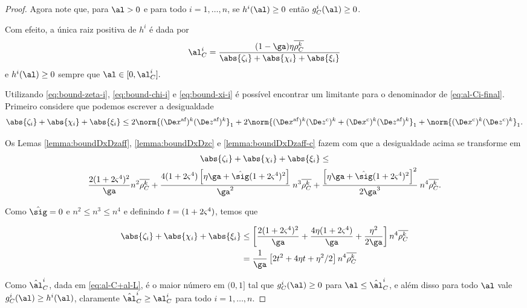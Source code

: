 \begin{proof}
Agora note que, para $\al>0$ e para todo $i=1,\ldots,n$, se $h^i(\al)\geq0$ então $g_C^i(\al)\geq 0$. 

Com efeito, a única raiz positiva de $h^i$ é dada por
\begin{equation}
	\label{eq:al-Ci-final}
	\al_{C}^i = \dfrac{(1-\ga)\eta\rhoCkb }{\abs{\zeta_i} + \abs{\chi_i} + \abs{\xi_i}}
\end{equation}
e $h^i(\al)\geq 0$ sempre que $\al\in[0,\al_{C}^i].$ 



Utilizando \eqref{eq:bound-zeta-i}, \eqref{eq:bound-chi-i} e \eqref{eq:bound-xi-i}  é possível encontrar um limitante para o denominador de \eqref{eq:al-Ci-final}. Primeiro considere que podemos escrever a  
desigualdade
\[
\abs{\zeta_i} + \abs{\chi_i} + \abs{\xi_i} \leq 2\norm{ \dekx  \dekz }_1 + 2 \norm{ \dekx \Dekcoz + \Dekcox \dekz }_1 + \norm{\Dekcox\Dekcoz}_1.
\]



Os Lemas \ref{lemma:boundDxDzaff},   \ref{lemma:boundDxDzc} e \ref{lemma:boundDxDzaff-c}  fazem com que a desigualdade acima se transforme em 
\begin{multline*}
\abs{\zeta_i} + \abs{\chi_i}  + \abs{\xi_i}  \leq \\  \frac{2(1 + 2\bdxzstar^{4})^{2} }{\ga} n^{2}\rhoCkb + 
												\dfrac{4(1+2\bdxzstar^{4})\left[\eta\ga + \nextsig(1+2\bdxzstar^{4})^{2}\right]}{\ga^{2}}\: n^{3}\rhoCkb + 	 \dfrac{\left[\eta\ga + \nextsig(1+2\bdxzstar^{4})^{2}\right]^{2}}{2\ga^{3}} \: n^{4}\rhoCkb.
\end{multline*}

Como $\nextsig = 0$ e $n^{2}\leq n^{3}\leq  n^{4}$ e definindo $t = (1 + 2\varsigma^{4})$, temos que 

	\begin{align}
	\abs{\zeta_i} + \abs{\chi_i} + \abs{\xi_i} & \leq \left[ \frac{2(1 + 2\bdxzstar^{4})^{2} }{\ga} + 												\dfrac{4\eta(1+2\bdxzstar^{4})}{\ga} +	 \dfrac{\eta^{2}}{2\ga} \right] n^{4}\rhoCkb \notag \\
										& =	\dfrac{1}{\ga}\left[ 2t^{2} + 4\eta t + \eta^{2}/2 \right] n^{4}\rhoCkb
										\label{eq:zeta+chi+xi}
	\end{align}

Como $\nextal^{i}_{C}$, dada em \eqref{eq:al-C+al-L}, é o maior número em $(0,1]$ tal que $g_{C}^{i}(\al)\geq 0$ para $\al\leq\nextal^{i}_{C}$, e além disso para todo $\al$ vale $g_{C}^{i}(\al) \geq h^{i}(\al)$, claramente $\nextal^{i}_{C} \geq  \al_{C}^i$ para todo $i=1,\ldots,n$.



\end{proof}
